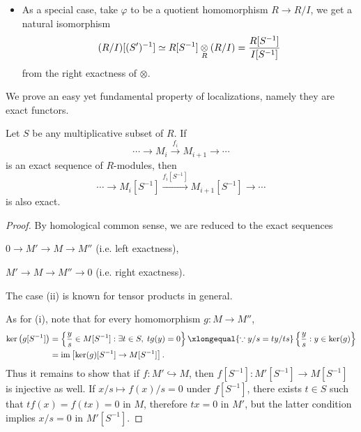 \begin{itemize}
	\[\begin{tikzcd}[row sep=tiny]
		\underbracket{R'[(S')^{-1}]}_{\text{as ring}} \arrow[r, "\sim"] & \underbracket{R'[S^{-1}]}_{\text{as module}} \arrow[equal, r] & R[S^{-1}] \dotimes{R} R' \\
		r'/\varphi(s) \arrow[mapsto, rr] & & (1/s) \otimes r' \\
		r'\varphi(r)/\varphi(s) & & (r/s) \otimes r' \arrow[mapsto, ll]
	\end{tikzcd}\]
	\item As a special case, take $\varphi$ to be a quotient homomorphism $R \to R/I$, we get a natural isomorphism
		\[ (R/I)[(S')^{-1}] \simeq R[S^{-1}] \underset{R}{\otimes} (R/I) = \frac{R[S^{-1}]}{I[S^{-1}]} \]
		from the right exactness of $\otimes$.
\end{itemize}

We prove an easy yet fundamental property of localizations, namely they are exact functors.
\begin{proposition}\label{prop:localization-exactness}
	Let $S$ be any multiplicative subset of $R$. If
	\[ \cdots \to M_i \xrightarrow{f_i} M_{i+1} \to \cdots \]
	is an exact sequence of $R$-modules, then
	\[ \cdots \to M_i[S^{-1}] \xrightarrow{f_i[S^{-1}]} M_{i+1}[S^{-1}] \to \cdots \]
	is also exact.
\end{proposition}
\begin{proof}
	By homological common sense, we are reduced to the exact sequences
	\begin{inparaenum}[(i)]
		\item $0 \to M' \to M \to M''$ (i.e. left exactness),
		\item $M' \to M \to M'' \to 0$ (i.e. right exactness).
	\end{inparaenum}
	The case (ii) is known for tensor products in general.
	
	As for (i), note that for every homomorphism $g: M \to M''$,
	\begin{align*}
		\Ker\left(g[S^{-1}]\right) & = \left\{ \frac{y}{s} \in M[S^{-1}]: \exists t \in S, \; t g(y)=0 \right\}  \xlongequal{\because y/s = ty/ts} \left\{ \frac{y}{s} : y \in \Ker(g)  \right\} \\
		& = \Image\left[ \Ker(g)[S^{-1}] \to M[S^{-1}] \right].
	\end{align*}
	Thus it remains to show that if $f: M' \hookrightarrow M$, then $f[S^{-1}]: M'[S^{-1}] \to M[S^{-1}]$ is injective as well. If $x/s \mapsto f(x)/s = 0$ under $f[S^{-1}]$, there exists $t \in S$ such that $tf(x) = f(tx) = 0$ in $M$, therefore $tx=0$ in $M'$, but the latter condition implies $x/s = 0$ in $M'[S^{-1}]$.
\end{proof}


